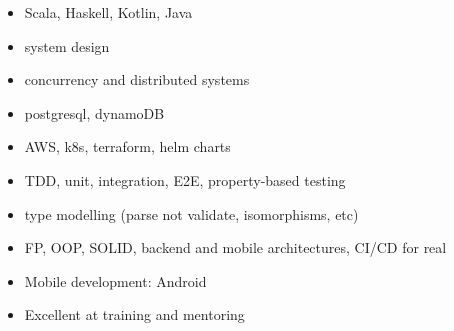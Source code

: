 \setlength{\columnsep}{-1.0cm}
 \begin{multicols}{2}
    \begin{itemize}
	    \item Scala, Haskell, Kotlin, Java
      \item system design
      \item concurrency and distributed systems 
        \item postgresql, dynamoDB
        \item AWS, k8s, terraform, helm charts 
	    \item TDD, unit, integration, E2E, property-based testing %
      \item type modelling (parse not validate, isomorphisms, etc)
	    \item FP, OOP, SOLID, backend and mobile architectures,
	    CI/CD for real 
        \item Mobile development: Android 
	    \item Excellent at training and mentoring 
    \end{itemize}
 \end{multicols}
